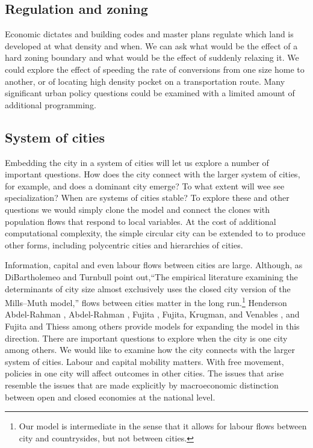 \subsection{Regulation and zoning}
Economic dictates and building codes and master plans regulate which land is developed at what density and when. We can ask what would be the effect of a hard zoning boundary and what would be the effect of suddenly relaxing it. We could explore the effect of speeding the rate of conversions from one size  home to another, or of locating high density pocket on a transportation route. Many significant urban policy questions could be examined with a limited amount of additional programming. 

\subsection{System of cities}
Embedding the city in a system of cities will let us  explore a number of important questions. How does the city connect with the larger system of cities, for example, and does a dominant city emerge? To what extent will wee see specialization? When are systems of cities stable? To explore these and other questions we would simply clone the model and connect the clones with population flows that respond to local variables. At the cost of additional computational complexity, the simple circular city can be extended to to produce other forms, including polycentric cities and hierarchies of cities.

Information, capital and even labour flows between cities are large.  Although, as DiBartholemeo and Turnbull \cite{dibartolomeoClosedVsOpen2023} point out,``The empirical literature examining the determinants of city size almost exclusively uses the closed city version of the Mills–Muth model,'' flows between cities matter in the long run.\footnote{Our model is intermediate in the sense that it allows for labour flows  between city and countrysides, but not between cities.} Henderson Abdel-Rahman \cite{Henderson1972Sizes}, Abdel-Rahman \cite{abdel-rahmanAgglomerationEconomiesTypes1990}, Fujita \cite{fujitaMonopolisticCompetitionModel1988}, Fujita, Krugman, and Venables \cite{fujitaSpatialEconomyCities1999}, and Fujita and Thiess \cite{fujitaEconomicsAgglomeration1996} among others provide models for expanding the model in this direction. There are important questions to explore when the city is one city among others. We would like to examine how the city connects with the larger system of cities.  Labour and capital mobility matters. With free movement, policies in one city will affect outcomes in other cities. The issues that arise resemble the issues that are made explicitly by  macroeconomic distinction between open and closed economies at the national level\cite{hendersonSystemsCitiesClosed1982, dibartolomeoUrbanSprawlClosed2021}.%


